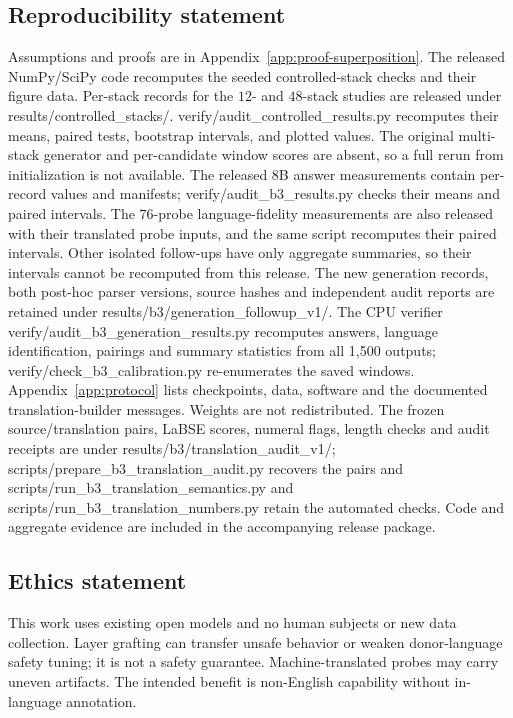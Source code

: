 \documentclass{article}
\newcommand{\artifact}[1]{\textsf{#1}}
\theoremstyle{plain}
\theoremstyle{definition}
\theoremstyle{remark}
\begin{document}
\subsection*{Reproducibility statement}
Assumptions and proofs are in Appendix~\ref{app:proof-superposition}. The
released NumPy/SciPy code recomputes the seeded controlled-stack checks and
their figure data. Per-stack records for the $12$- and $48$-stack studies are
released under \artifact{results/controlled\_stacks/}.
\artifact{verify/audit\_controlled\_results.py} recomputes their means,
paired tests, bootstrap intervals, and plotted values. The original
multi-stack generator and per-candidate window scores are absent, so a full
rerun from initialization is not available. The released 8B answer
measurements contain per-record values and
manifests; \artifact{verify/audit\_b3\_results.py} checks their means and
paired intervals. The $76$-probe language-fidelity measurements are also
released with their translated probe inputs, and the same script recomputes their paired
intervals. Other isolated follow-ups have only aggregate summaries, so their
intervals cannot be recomputed from this release.
The new generation records, both post-hoc parser versions, source hashes and
independent audit reports are retained under
\artifact{results/b3/generation\_followup\_v1/}. The CPU verifier
\artifact{verify/audit\_b3\_generation\_results.py} recomputes answers, language
identification, pairings and summary statistics from all 1,500 outputs;
\artifact{verify/check\_b3\_calibration.py} re-enumerates the saved windows.
Appendix~\ref{app:protocol} lists checkpoints, data, software and the documented
translation-builder messages. Weights are not redistributed.
The frozen source/translation pairs, LaBSE scores, numeral flags, length checks
and audit receipts are under \artifact{results/b3/translation\_audit\_v1/};
\artifact{scripts/prepare\_b3\_translation\_audit.py} recovers the pairs and
\artifact{scripts/run\_b3\_translation\_semantics.py} and
\artifact{scripts/run\_b3\_translation\_numbers.py} retain the automated checks.
Code and aggregate evidence are included in the accompanying release package.

\subsection*{Ethics statement}
This work uses existing open models and no human subjects or new data collection.
Layer grafting can transfer unsafe behavior or weaken donor-language safety
tuning; it is not a safety guarantee. Machine-translated probes may carry
uneven artifacts. The intended benefit is non-English capability without
in-language annotation.
\end{document}
